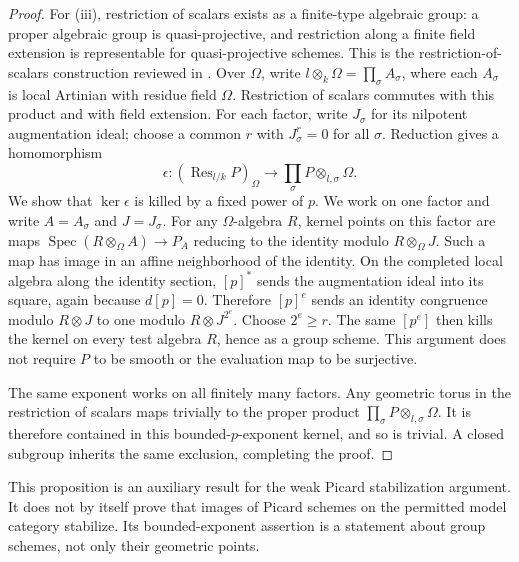 \begin{proof}
For (iii), restriction of scalars exists as a finite-type algebraic
group: a proper algebraic group is quasi-projective, and restriction
along a finite field extension is representable for quasi-projective
schemes.  This is the restriction-of-scalars construction reviewed in
\cite[Section 2i, pp.~56--59]{MilneAG2022B}.
Over $\Omega$, write
$l\otimes_k\Omega=\prod_\sigma A_\sigma$, where each $A_\sigma$ is
local Artinian with residue field $\Omega$.  Restriction of scalars
commutes with this product and with field extension.  For each factor,
write $J_\sigma$ for its nilpotent augmentation ideal; choose a common
$r$ with $J_\sigma^r=0$ for all $\sigma$.  Reduction gives a homomorphism
\[
 \epsilon:(\operatorname{Res}_{l/k}P)_\Omega
       \longrightarrow\prod_\sigma P\otimes_{l,\sigma}\Omega.
\]
We show that $\ker\epsilon$ is killed by a fixed power of $p$.
We work on one factor and write $A=A_\sigma$ and $J=J_\sigma$.
For any $\Omega$-algebra $R$, kernel points on this factor are maps
$\operatorname{Spec}(R\otimes_\Omega A)\to P_A$ reducing to the identity
modulo $R\otimes_\Omega J$.  Such a map has image in an affine
neighborhood of the identity.  On the completed local algebra along
the identity section, $[p]^*$ sends the augmentation ideal into its
square, again because $d[p]=0$.  Therefore $[p]^e$ sends an identity
congruence modulo $R\otimes J$ to one modulo $R\otimes J^{2^e}$.
Choose $2^e\ge r$.  The same $[p^e]$ then kills the kernel on every
test algebra $R$, hence as a group scheme.  This argument does not
require $P$ to be smooth or the evaluation map to be surjective.

The same exponent works on all finitely many factors.  Any geometric
torus in the restriction of scalars maps trivially to the proper
product $\prod_\sigma P\otimes_{l,\sigma}\Omega$.  It is therefore contained in this
bounded-$p$-exponent kernel, and so is trivial.  A closed subgroup
inherits the same exclusion, completing the proof.
\end{proof}

\begin{remark}
This proposition is an auxiliary result for the weak Picard
stabilization argument.  It does not by itself prove that images of
Picard schemes on the permitted model category stabilize.  Its
bounded-exponent assertion is a statement about group schemes, not
only their geometric points.
\end{remark}
